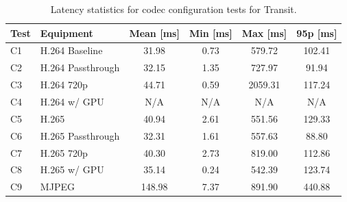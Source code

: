 \begin{table}[H]
    \centering
    \caption{Latency statistics for codec configuration tests for Transit.}\label{tab:transit_codec_latency}
    \begin{tabular}{|l|l|c|c|c|c|}
    \hline
    \textbf{Test} & \textbf{Equipment} & \textbf{Mean [ms]} & \textbf{Min [ms]} & \textbf{Max [ms]} & \textbf{95p [ms]} \\
    \hline
    C1 & H.264 Baseline & 31.98 & 0.73 & 579.72 & 102.41\\
    \hline
    C2 & H.264 Passthrough & 32.15 & 1.35 & 727.97 & 91.94  \\
    \hline
    C3 & H.264 720p & 44.71 & 0.59 & 2059.31 & 117.24 \\
    \hline
    C4 & H.264 w/ GPU & N/A & N/A & N/A & N/A  \\
    \hline
    C5 & H.265 & 40.94 & 2.61 & 551.56 & 129.33\\
    \hline
    C6 & H.265 Passthrough & 32.31 & 1.61 & 557.63 & 88.80 \\
    \hline
    C7 & H.265 720p & 40.30 & 2.73 & 819.00 & 112.86 \\
    \hline
    C8 & H.265 w/ GPU & 35.14 & 0.24 & 542.39 & 123.74 \\
    \hline
    C9 & MJPEG & 148.98 & 7.37 & 891.90 & 440.88  \\
    \hline
    \end{tabular}
\end{table}
